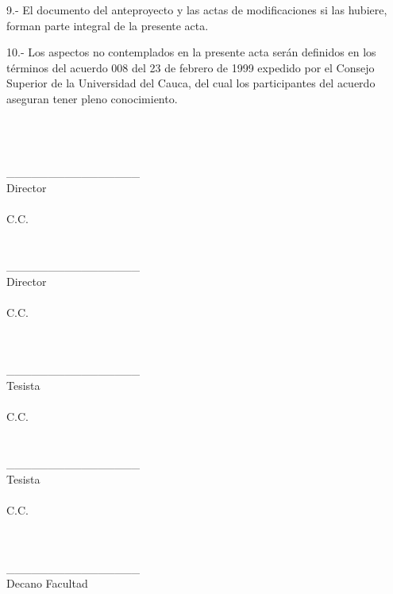 9.- El documento del anteproyecto y las actas de modificaciones si las hubiere, forman parte integral de la presente acta.

10.- Los aspectos no contemplados en la presente acta serán definidos en los términos del acuerdo 008 del 23 de febrero de 1999 expedido por el Consejo Superior de la Universidad del Cauca, del cual los participantes del acuerdo aseguran tener pleno conocimiento. 

~\\~\\~\\

\noindent
\_\_\_\_\_\_\_\_\_\_\_\_\_\_\_\_~\\
Director~\\
\mythesistutor{}~\\
C.C. \myidthesistutorcard{}
~\\~\\~\\


\ifdefined\mythesiscotutor
\noindent
\_\_\_\_\_\_\_\_\_\_\_\_\_\_\_\_~\\
Director~\\
\mythesiscotutor{}~\\
C.C. \myidthesiscotutorcard{}
~\\~\\~\\
\fi


\noindent
\_\_\_\_\_\_\_\_\_\_\_\_\_\_\_\_~\\
Tesista~\\
\myauthor{}~\\
C.C. \myidauthorcard{}
~\\~\\~\\



\ifdefined\mycoauthor
\noindent
 \_\_\_\_\_\_\_\_\_\_\_\_\_\_\_\_~\\
Tesista~\\
\mycoauthor{}~\\
C.C. \myidcoauthorcard{}
~\\~\\~\\
\fi


\noindent
 \_\_\_\_\_\_\_\_\_\_\_\_\_\_\_\_~\\
Decano Facultad






